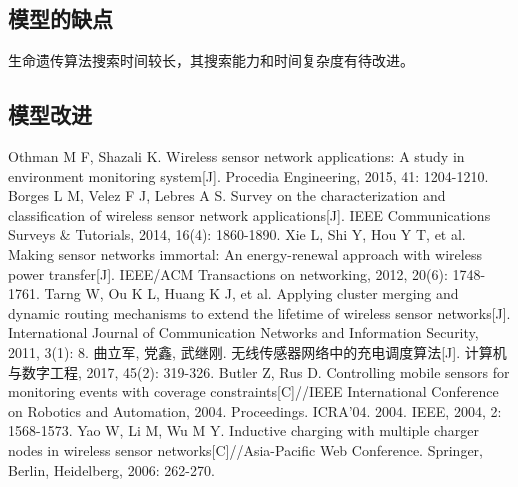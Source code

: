 \documentclass{whutmod}
\begin{document}
		\subsection{模型的缺点}
 			生命遗传算法搜索时间较长，其搜索能力和时间复杂度有待改进。

  		\subsection{模型改进}

  
  
 
	\newpage	%
	\nocite{*}		%
	\begin{thebibliography}{9}%
		Othman M F, Shazali K. Wireless sensor network applications: A study in environment monitoring system[J]. Procedia Engineering, 2015, 41: 1204-1210.
		Borges L M, Velez F J, Lebres A S. Survey on the characterization and classification of wireless sensor network applications[J]. IEEE Communications Surveys \& Tutorials, 2014, 16(4): 1860-1890.
		Xie L, Shi Y, Hou Y T, et al. Making sensor networks immortal: An energy-renewal approach with wireless power transfer[J]. IEEE/ACM Transactions on networking, 2012, 20(6): 1748-1761.
		Tarng W, Ou K L, Huang K J, et al. Applying cluster merging and dynamic routing mechanisms to extend the lifetime of wireless sensor networks[J]. International Journal of Communication Networks and Information Security, 2011, 3(1): 8.
		曲立军, 党鑫, 武继刚. 无线传感器网络中的充电调度算法[J]. 计算机与数字工程, 2017, 45(2): 319-326.
		Butler Z, Rus D. Controlling mobile sensors for monitoring events with coverage constraints[C]//IEEE International Conference on Robotics and Automation, 2004. Proceedings. ICRA'04. 2004. IEEE, 2004, 2: 1568-1573.
		Yao W, Li M, Wu M Y. Inductive charging with multiple charger nodes in wireless sensor networks[C]//Asia-Pacific Web Conference. Springer, Berlin, Heidelberg, 2006: 262-270.
	
	\end{thebibliography}
%
%			
%			
\end{document}
